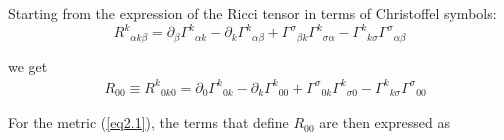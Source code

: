 Starting from the expression of the Ricci tensor in terms of Christoffel symbols:
\begin{equation*}
    R^k {}_{\alpha k \beta} = \partial_\beta  \Gamma^k {}_{\alpha k} -\partial_k \Gamma^k {}_{\alpha \beta}+  \Gamma^\sigma {}_{\beta k} \Gamma^k {}_{\sigma \alpha}  -\Gamma^k {}_{k \sigma} \Gamma^\sigma {}_{\alpha \beta} 
\end{equation*}

we get 
\begin{align*}
    &R_{0 0} \equiv R^k {}_{0 k 0} =  \partial_0  \Gamma^k {}_{0 k}-\partial_k \Gamma^k {}_{0 0}  + \Gamma^\sigma {}_{0 k} \Gamma^k {}_{\sigma 0} - \Gamma^k {}_{k \sigma} \Gamma^\sigma {}_{0 0}   
\end{align*}

For the metric (\ref{eq2.1}), the terms that define $R_{00}$ are then expressed as
